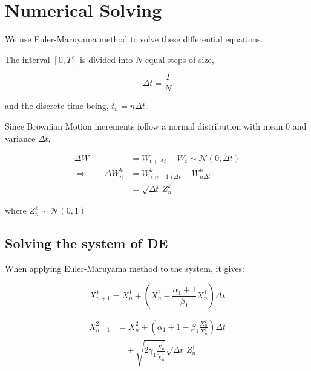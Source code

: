 \documentclass[conference]{IEEEtran}
\renewcommand{\bigskip}{\vspace{2\baselineskip}}
\renewcommand{\medskip}{\vspace{1\baselineskip}}
\renewcommand{\smallskip}{\vspace{0.5\baselineskip}}
\theoremstyle{definitionsc}
\theoremstyle{plainsc}
\theoremstyle{remarksc}
\begin{document}
\bigskip








\section{Numerical Solving}

We use Euler-Maruyama method \cite{eulermaruyama} to solve these differential equations.

The interval $[0,T]$ is divided into $N$ equal steps of size,

\begin{equation*}
	\Delta t = \frac{T}{N}
\end{equation*}

and the discrete time being, $t_n = n \Delta t$.

\smallskip

Since Brownian Motion increments follow a normal distribution with mean $0$ and variance $\Delta t$, 

\begin{align*}
	\Delta W &= W_{t + \Delta t} - W_t \sim \mathcal{N}(0, \Delta t)\\
	\Rightarrow \qquad \Delta W_n^k &= W_{(n+1)\Delta t}^k-W_{n\Delta t}^k\\
	&= \sqrt{\Delta t}\,Z_n^k
\end{align*}

where $Z_n^k \sim \mathcal{N}(0,1)$



\medskip


\subsection*{\textbf{Solving the system of DE}}

When applying Euler-Maruyama method to the system, it gives:

\begin{equation}
	X_{n+1}^1 = X_n^1 + \left( X_n^2 - \frac{\alpha_1+1}{\beta_1} X_n^1 \right) \Delta t
\end{equation}





\begin{equation}
\begin{aligned}
    X_{n+1}^2
&=
X_n^2+
\left(\alpha_1+1-\beta_1\frac{X_n^2}{X_n^1}\right)\Delta t
\\
&\quad+
\sqrt{2\gamma_1\frac{\widetilde{X}_n^2}{\widetilde{X}_n^1}}
\sqrt{\Delta t}\,Z_n^1
\end{aligned}
\end{equation}
\end{document}
